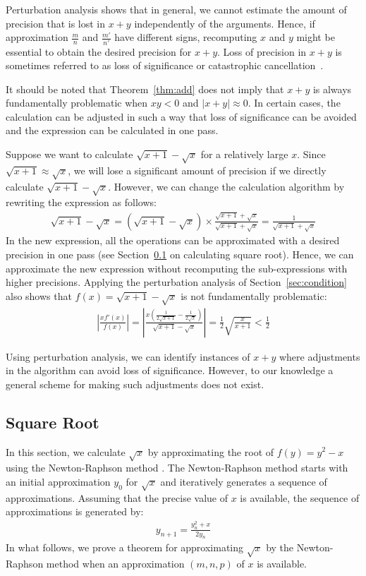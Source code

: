 \documentclass{article}
\numberwithin{mytheorem}{section}
\begin{document}
Perturbation analysis shows that in general, we cannot estimate the amount of precision that is lost in $x+y$ independently of the arguments. Hence, if approximation $\frac{m}{n}$ and $\frac{m'}{n'}$ have different signs, recomputing $x$ and $y$  might be essential to obtain the desired precision for $x+y$. Loss of precision in $x+y$ is sometimes referred to as loss of significance \cite{KC02} or catastrophic cancellation~\cite{FT86}.

It should be noted that Theorem~\ref{thm:add} does not imply that $x+y$ is always fundamentally problematic when $xy<0$ and $|x+y|\approx 0$. In certain cases, the calculation can be adjusted in such a way that loss of significance can be avoided and the expression can be calculated in one pass.

Suppose we want to calculate $\sqrt{x+1}-\sqrt{x}$ for a relatively large $x$. Since $\sqrt{x+1}\approx\sqrt{x}$, we will lose a significant amount of precision if we directly calculate $\sqrt{x+1}-\sqrt{x}$. However, we can change the calculation algorithm by rewriting the expression as follows:
\begin{align*}
\sqrt{x+1}-\sqrt{x}=(\sqrt{x+1}-\sqrt{x})\times \frac{\sqrt{x+1}+\sqrt{x}}{\sqrt{x+1}+\sqrt{x}}=\frac{1}{\sqrt{x+1}+\sqrt{x}}
\end{align*}
In the new expression, all the operations can be approximated with a desired precision in one pass (see Section~\ref{subsec:sqrt} on calculating square root). Hence, we can approximate the new expression without recomputing the sub-expressions with higher precisions. Applying the perturbation analysis of Section~\ref{sec:condition} also shows that $f(x)=\sqrt{x+1}-\sqrt{x}$ is not fundamentally problematic:
\begin{align*}
|\frac{xf'(x)}{f(x)}|=|\frac{x(\frac{1}{2\sqrt{x+1}}-\frac{1}{2\sqrt{x}})}{\sqrt{x+1}-\sqrt{x}}|=\frac{1}{2}\sqrt{\frac{x}{x+1}}<\frac{1}{2}
\end{align*}

Using perturbation analysis, we can identify instances of $x+y$ where adjustments in the algorithm can avoid loss of significance. However, to our knowledge a general scheme for making such adjustments does not exist. 




\subsection{Square Root}
\label{subsec:sqrt}
In this section, we calculate $\sqrt{x}$ by approximating the root of $f(y)=y^2-x$ using the Newton-Raphson method \cite{KC02}.
The Newton-Raphson method starts with an initial approximation $y_0$ for $\sqrt{x}$ and iteratively generates a sequence of approximations. Assuming that the precise value of $x$ is available, the sequence of approximations is generated by:
\begin{align*}
y_{n+1}=\frac{y_n^2+x}{2y_n}
\end{align*}
In what follows, we prove a theorem for approximating $\sqrt{x}$ by the Newton-Raphson method when an approximation $(m,n,p)$ of $x$ is available. 
 
\end{document}
